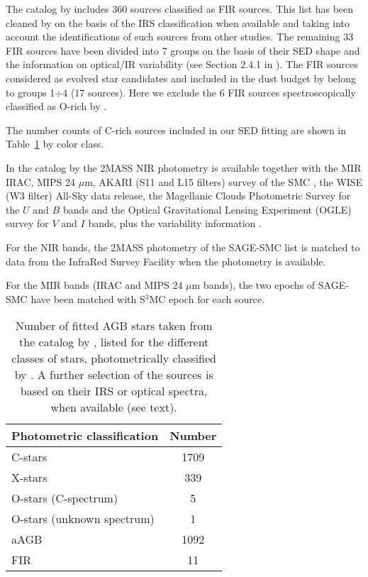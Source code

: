 \documentclass[useAMS,usenatbib]{mn2e/mn2e}
\begin{document}
The catalog by \citet{Boyer11} includes 360 sources classified as FIR sources. This list has been cleaned by \citet{Srinivasan16} on the basis of the IRS classification when available and taking into account the identifications of such sources from other studies. The remaining 33 FIR sources have been divided into 7 groups on the basis of their SED shape and the information on optical/IR variability (see Section 2.4.1 in \citealt{Srinivasan16}). The FIR sources considered as evolved star candidates and included in the dust budget by \citet{Srinivasan16} belong to groups 1$\div$4 (17 sources). Here we exclude the 6 FIR sources spectroscopically classified as O-rich by \citet{Ruffle15}.

The number counts of C-rich sources included in our SED fitting are shown in  Table~\ref{stars_cat} by color class.

In the catalog by \citet{Srinivasan16} the 2MASS NIR photometry is available together with the MIR IRAC, MIPS 24 $\mu$m, AKARI (S11 and L15 filters) survey of the SMC \citep{Ita10}, the WISE (W3 filter) All-Sky data release, the Magellanic Clouds Photometric Survey \citep[MCPS;][]{Zaritsky02} for the $U$ and $B$ bands and the Optical Gravitational Lensing Experiment (OGLE) survey for $V$ and $I$ bands, plus the variability information \citep[OGLE-III;][]{Udalski08}. 

For the NIR bands, the 2MASS photometry of the SAGE-SMC list is matched to data from the InfraRed Survey Facility \citep[IRSF;][]{Kato07} when the photometry is available. 

For the MIR bands (IRAC and MIPS 24 $\mu$m bands), the two epochs of SAGE-SMC have been matched with S$^3$MC epoch for each source. 

\begin{table}
\begin{center}
\caption{Number of fitted AGB stars taken from the catalog by \citet{Srinivasan16}, listed for the different classes of stars, photometrically classified by \citet{Boyer11}. A further selection of the sources is based on their IRS or optical spectra, when available (see text).}
\label{stars_cat}
\begin{tabular}{l c}
\hline
Photometric classification  & Number \\
\hline
C-stars & 1709 \\
X-stars & 339\\
O-stars (C-spectrum) & 5\\
O-stars (unknown spectrum) & 1\\
aAGB  &  1092 \\
FIR &  11 \\
\hline
\end{tabular}
\end{center}
\end{table}
\end{document}
